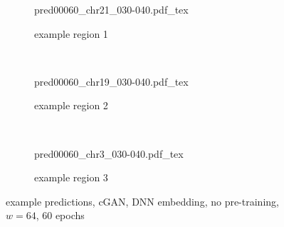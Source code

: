 \begin{figure}[p] %
    \begin{subfigure}{\textwidth}
        \centering
        \scriptsize
        {pred00060_chr21_030-040.pdf_tex}
        \caption{example  region 1} \label{fig:results:cGAN64-dnn_r1}
    \end{subfigure}\\[6mm]
    \begin{subfigure}{\textwidth}
        \centering
        \scriptsize
        {pred00060_chr19_030-040.pdf_tex}
        \caption{example region 2} \label{fig:results:cGAN64-dnn_r2}
    \end{subfigure}\\[6mm]
    \begin{subfigure}{\textwidth}
        \centering
        \scriptsize
        {pred00060_chr3_030-040.pdf_tex}
        \caption{example region 3} \label{fig:results:cGAN64-dnn_r3}
    \end{subfigure}
    \caption{example predictions, cGAN, DNN embedding, no pre-training, $w=64$, 60 epochs} \label{fig:results:GAN64-dnn_matrices}
\end{figure}
